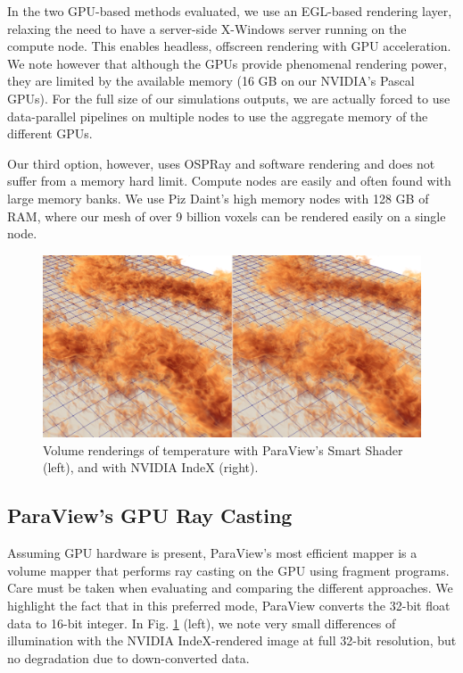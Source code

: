 \documentclass[final,5p,times,twocolumn]{elsarticle}
\begin{document}
In the two GPU-based methods evaluated, we use an EGL-based rendering layer,
relaxing the need to have a server-side X-Windows server running on the compute node.
This enables headless, offscreen rendering with GPU acceleration. We note however that although
the GPUs provide phenomenal rendering power, they are limited by the available memory
(16 GB on our NVIDIA's Pascal GPUs). For the full size of our simulations outputs, we are actually forced to use data-parallel
pipelines on multiple nodes to use the aggregate memory of the different GPUs.

Our third option, however, uses OSPRay and software rendering and does not suffer
from a memory hard limit. Compute nodes are easily and often found with large memory
banks. We use Piz Daint's high memory nodes with 128 GB of RAM, where our mesh of
over 9 billion voxels can be rendered easily on a single node.

\begin{figure}
	\centering
	\includegraphics[width=\linewidth]{fig2}%
	\caption{\label{fig:gpucloseup} Volume renderings of temperature with ParaView's
Smart Shader (left), and with NVIDIA IndeX (right).}
\end{figure}

\subsection{ParaView's GPU Ray Casting} \label{smart}

Assuming GPU hardware is present,
ParaView's most efficient mapper 
is a volume
mapper that performs ray casting on the GPU using fragment programs. Care must
be taken when evaluating and comparing the different approaches. We highlight the
fact that in this preferred mode, ParaView converts the 32-bit float data to 16-bit
integer. In Fig. \ref{fig:gpucloseup} (left), we note very small differences of illumination with the
NVIDIA IndeX-rendered image at full 32-bit resolution,
but no degradation due to down-converted data.
\end{document}
